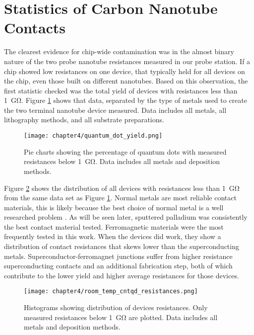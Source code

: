 \section{Statistics of Carbon Nanotube Contacts}

The clearest evidence for chip-wide contamination was in the almost binary nature of the two probe nanotube resistances measured in our probe station. If a chip showed low resistances on one device, that typically held for all devices on the chip, even those built on different nanotubes. Based on this observation, the first statistic checked was the total yield of devices with resistances less than \SI{1}{\giga\ohm}. Figure \ref{fig:quantum_dot_yield} shows that data, separated by the type of metals used to create the two terminal nanotube device measured. Data includes all metals, all lithography methods, and all substrate preparations.

\begin{figure}
    \centering
    \texttt{[image: chapter4/quantum\_dot\_yield.png]}
    \caption{Pie charts showing the percentage of quantum dots with measured resistances below \SI{1}{\giga\ohm}. Data includes all metals and deposition methods.}
    \label{fig:quantum_dot_yield}
\end{figure}

Figure \ref{fig:rt_resistances} shows the distribution of all devices with resistances less than \SI{1}{\giga\ohm} from the same data set as Figure \ref{fig:quantum_dot_yield}. Normal metals are most reliable contact materials, this is likely because the best choice of normal metal is a well researched problem \cite{Javey2003, Song2011, Kane2011}. As will be seen later, sputtered palladium was consistently the best contact material tested. Ferromagnetic materials were the most frequently tested in this work. When the devices did work, they show a distribution of contact resistances that skews lower than the superconducting metals. Superconductor-ferromagnet junctions suffer from higher resistance superconducting contacts and an additional fabrication step, both of which contribute to the lower yield and higher average resistances for those devices.

\begin{figure}
    \centering
    \texttt{[image: chapter4/room\_temp\_cntqd\_resistances.png]}
    \caption{Histograms showing distribution of devices resistances. Only measured resistances below \SI{1}{\giga\ohm} are plotted. Data includes all metals and deposition methods.}
    \label{fig:rt_resistances}
\end{figure}

